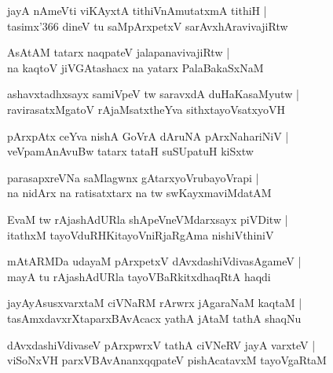 \documentclass[twoside,12pt,openright]{book}
\newcounter{shloka}[chapter]
\begin{document}
\begin{shloka}%
jayA nAmeVti viKAyxtA tithiVnAmutatxmA tithiH |\\
tasimx\char'366 dineV tu saMpArxpetxV sarAvxhAravivajiRtw 
\end{shloka}

\begin{shloka}%
AsAtAM tatarx naqpateV jalapanavivajiRtw |\\
na kaqtoV jiVGAtashacx na yatarx PalaBakaSxNaM
\end{shloka}

\begin{shloka}%
ashavxtadhxsayx samiVpeV tw saravxdA duHaKasaMyutw |\\
ravirasatxMgatoV rAjaMsatxtheYva sithxtayoVsatxyoVH
\end{shloka}

\begin{shloka}%
pArxpAtx ceYva nishA GoVrA dAruNA pArxNahariNiV |\\
veVpamAnAvuBw tatarx tataH suSUpatuH kiSxtw
\end{shloka}

\begin{shloka}%
parasapxreVNa saMlagwnx gAtarxyoVrubayoVrapi |\\
na nidArx na ratisatxtarx na tw swKayxmaviMdatAM 
\end{shloka}

\begin{shloka}%
EvaM tw rAjashAdURla shApeVneVMdarxsayx piVDitw |\\
itathxM tayoVduRHKitayoVniRjaRgAma nishiVthiniV 
\end{shloka}

\begin{shloka}%
mAtARMDa udayaM pArxpetxV dAvxdashiVdivasAgameV |\\
mayA tu rAjashAdURla tayoVBaRkitxdhaqRtA haqdi 
\end{shloka}

\begin{shloka}%
jayAyAsusxvarxtaM ciVNaRM rArwrx jAgaraNaM kaqtaM |\\
tasAmxdavxrXtaparxBAvAcacx yathA jAtaM tathA shaqNu
\end{shloka}

\begin{shloka}%
dAvxdashiVdivaseV pArxpwrxV tathA ciVNeRV jayA varxteV |\\
viSoNxVH parxVBAvAnanxqqpateV pishAcatavxM tayoVgaRtaM 
\end{shloka}
\end{document}
